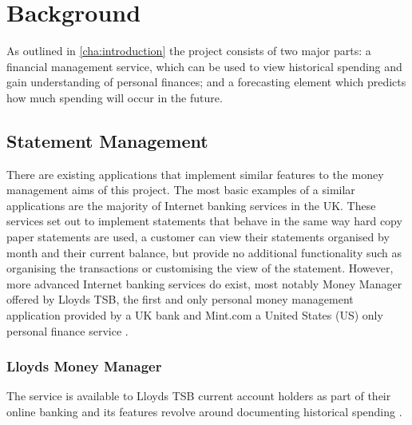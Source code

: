 \begin{comment}
Chapter 2: Background and literature survey
This chapter should give essential background information with references to published material in research papers, books, URLs, magazine articles and even newspapers. Expand on any references to other work that have been mentioned in Chapter 1. Refer to the notes on references (below) for the preferred way of referencing publications. The reader, stimulated by the presentation of ideas in this section, may be led to consult some or all of the referenced publications. This section will be useful for any student in a subsequent year who wishes to take the project further.
\end{comment}

\chapter{Background}
\label{cha:background}
As outlined in \autoref{cha:introduction} the project consists of two major parts: a financial management service, which can be used to view historical spending and gain understanding of personal finances; and a forecasting element which predicts how much spending will occur in the future. 

\section{Statement Management}
There are existing applications that implement similar features to the money management aims of this project. The most basic examples of a similar applications are the majority of Internet banking services in the UK. These services set out to implement statements that behave in the same way hard copy paper statements are used, a customer can view their statements organised by month and their current balance, but provide no additional functionality such as organising the transactions or customising the view of the statement. However, more advanced Internet banking services do exist, most notably Money Manager offered by Lloyds TSB, the first and only personal money management application provided by a UK bank and Mint.com a United States (US) only personal finance service \parencite{lloyds2014moneymanager, mint2014whatismint}.

\subsection{Lloyds Money Manager}
The service is available to Lloyds TSB current account holders as part of their online banking and its features revolve around documenting historical spending \parencite{lloyds2014money}.

